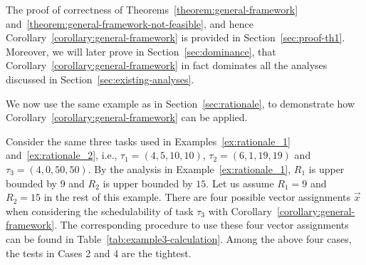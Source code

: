  
  The proof of correctness of Theorems~\ref{theorem:general-framework} and~\ref{theorem:general-framework-not-feasible}, and hence Corollary~\ref{corollary:general-framework} is provided in Section~\ref{sec:proof-th1}. Moreover, we will later prove in Section~\ref{sec:dominance}, that Corollary~\ref{corollary:general-framework} in fact dominates all the analyses discussed in Section~\ref{sec:existing-analyses}.
 
 We now use the same example as in Section~\ref{sec:rationale}, to demonstrate how
Corollary~\ref{corollary:general-framework} can be applied.
 
 \begin{example}
 \label{ex:general_framework}
  Consider the same three tasks used in Examples~\ref{ex:rationale_1} and~\ref{ex:rationale_2}, i.e., $\tau_1 = (4, 5, 10, 10)$, $\tau_2 =(6, 1, 19, 19)$ and $\tau_3 = (4, 0, 50, 50)$. By the analysis in Example~\ref{ex:rationale_1}, $R_1$ is upper bounded by $9$ and $R_2$ is upper bounded by $15$. Let us assume $R_1=9$ and $R_2=15$ in the rest of this example. There are four possible vector assignments $\vec{x}$ when considering the schedulability of task $\tau_3$ with Corollary~\ref{corollary:general-framework}.
%
%       
%
%
%
The corresponding procedure to use these four vector assignments can be found in Table~\ref{tab:example3-calculation}. 
Among the above four cases, the tests in Cases 2 and 4 are the
tightest. 
\hfill\myendproof
 \end{example}

